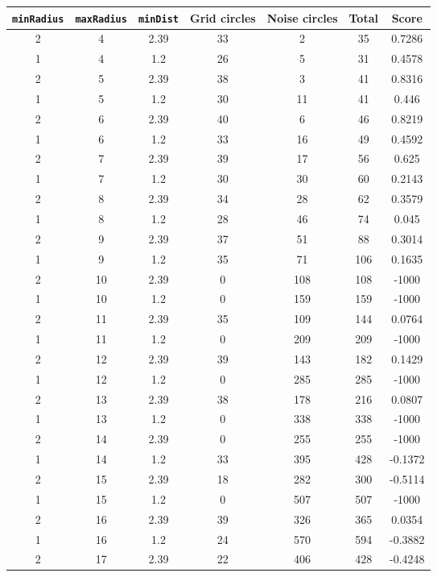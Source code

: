 \documentclass[letterpaper, 12pt]{article}
\begin{document}
\begin{longtable}{|c|c|c|c|c|c|c|}
\hline
\textbf{\texttt{minRadius}} & \textbf{\texttt{maxRadius}} & \textbf{\texttt{minDist}} & \textbf{Grid circles} & \textbf{Noise circles} & \textbf{Total} & \textbf{Score} \\
\hline
2 & 4 & 2.39 & 33 & 2 & 35 & 0.7286 \\
\hline
1 & 4 & 1.2 & 26 & 5 & 31 & 0.4578 \\
\hline
2 & 5 & 2.39 & 38 & 3 & 41 & 0.8316 \\
\hline
1 & 5 & 1.2 & 30 & 11 & 41 & 0.446 \\
\hline
2 & 6 & 2.39 & 40 & 6 & 46 & 0.8219 \\
\hline
1 & 6 & 1.2 & 33 & 16 & 49 & 0.4592 \\
\hline
2 & 7 & 2.39 & 39 & 17 & 56 & 0.625 \\
\hline
1 & 7 & 1.2 & 30 & 30 & 60 & 0.2143 \\
\hline
2 & 8 & 2.39 & 34 & 28 & 62 & 0.3579 \\
\hline
1 & 8 & 1.2 & 28 & 46 & 74 & 0.045 \\
\hline
2 & 9 & 2.39 & 37 & 51 & 88 & 0.3014 \\
\hline
1 & 9 & 1.2 & 35 & 71 & 106 & 0.1635 \\
\hline
2 & 10 & 2.39 & 0 & 108 & 108 & -1000 \\
\hline
1 & 10 & 1.2 & 0 & 159 & 159 & -1000 \\
\hline
2 & 11 & 2.39 & 35 & 109 & 144 & 0.0764 \\
\hline
1 & 11 & 1.2 & 0 & 209 & 209 & -1000 \\
\hline
2 & 12 & 2.39 & 39 & 143 & 182 & 0.1429 \\
\hline
1 & 12 & 1.2 & 0 & 285 & 285 & -1000 \\
\hline
2 & 13 & 2.39 & 38 & 178 & 216 & 0.0807 \\
\hline
1 & 13 & 1.2 & 0 & 338 & 338 & -1000 \\
\hline
2 & 14 & 2.39 & 0 & 255 & 255 & -1000 \\
\hline
1 & 14 & 1.2 & 33 & 395 & 428 & -0.1372 \\
\hline
2 & 15 & 2.39 & 18 & 282 & 300 & -0.5114 \\
\hline
1 & 15 & 1.2 & 0 & 507 & 507 & -1000 \\
\hline
2 & 16 & 2.39 & 39 & 326 & 365 & 0.0354 \\
\hline
1 & 16 & 1.2 & 24 & 570 & 594 & -0.3882 \\
\hline
2 & 17 & 2.39 & 22 & 406 & 428 & -0.4248 \\

\end{longtable}
\end{document}
